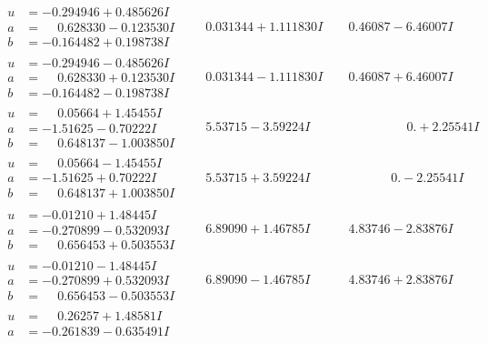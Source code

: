 \documentclass[1p]{elsarticle_modified}
\theoremstyle{definition}
\begin{document}
$$\begin{array}{c|c|c}
\begin{aligned}
u &= -0.294946 + 0.485626 I \\
a &= \phantom{-}0.628330 - 0.123530 I \\
b &= -0.164482 + 0.198738 I\end{aligned}
 & \phantom{-}0.031344 + 1.111830 I & \phantom{-}0.46087 - 6.46007 I \\ \hline\begin{aligned}
u &= -0.294946 - 0.485626 I \\
a &= \phantom{-}0.628330 + 0.123530 I \\
b &= -0.164482 - 0.198738 I\end{aligned}
 & \phantom{-}0.031344 - 1.111830 I & \phantom{-}0.46087 + 6.46007 I \\ \hline\begin{aligned}
u &= \phantom{-}0.05664 + 1.45455 I \\
a &= -1.51625 - 0.70222 I \\
b &= \phantom{-}0.648137 - 1.003850 I\end{aligned}
 & \phantom{-}5.53715 - 3.59224 I & \phantom{-0.000000 -}0. + 2.25541 I \\ \hline\begin{aligned}
u &= \phantom{-}0.05664 - 1.45455 I \\
a &= -1.51625 + 0.70222 I \\
b &= \phantom{-}0.648137 + 1.003850 I\end{aligned}
 & \phantom{-}5.53715 + 3.59224 I & \phantom{-0.000000 } 0. - 2.25541 I \\ \hline\begin{aligned}
u &= -0.01210 + 1.48445 I \\
a &= -0.270899 - 0.532093 I \\
b &= \phantom{-}0.656453 + 0.503553 I\end{aligned}
 & \phantom{-}6.89090 + 1.46785 I & \phantom{-}4.83746 - 2.83876 I \\ \hline\begin{aligned}
u &= -0.01210 - 1.48445 I \\
a &= -0.270899 + 0.532093 I \\
b &= \phantom{-}0.656453 - 0.503553 I\end{aligned}
 & \phantom{-}6.89090 - 1.46785 I & \phantom{-}4.83746 + 2.83876 I \\ \hline\begin{aligned}
u &= \phantom{-}0.26257 + 1.48581 I \\
a &= -0.261839 - 0.635491 I \\

\end{aligned}
\end{array}$$
\end{document}
